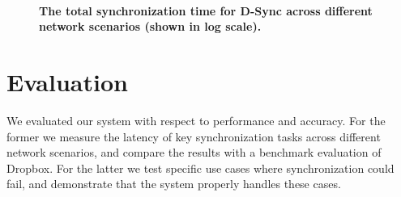 \begin{figure}[t]
\centering
{}
~~~~
\caption{\textbf{The total synchronization time for D-Sync across different network scenarios (shown in log scale).}}
\end{figure}


\section{Evaluation}
\label{evaluation}
We evaluated our system with respect to performance and accuracy.
For the former we measure the latency of key synchronization tasks
across different network scenarios, and compare the results
with a benchmark evaluation of Dropbox. For the latter we test specific use cases
where synchronization could fail, and demonstrate that the system
properly handles these cases.

